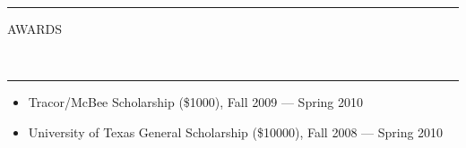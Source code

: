\documentclass[10pt, letterpaper, oneside]{article}
\newcommand{\HRule}[2]{\textcolor{#1}{\rule{\linewidth}{#2}}}
\newcommand{\sectiontitle}[1]{\begin{minipage}{\textwidth}\HRule{black}{0.25mm}\vspace{-10pt}\begin{center}\Large\MakeUppercase{#1}\end{center}\end{minipage}\\\HRule{light-grey}{0.15mm}\vspace{\baselineskip}}
\newenvironment{ressection}[1]{
  \sectiontitle{#1}}
  {\vspace{-\baselineskip}}
\newenvironment{tightressection}[1]{
  \begin{minipage}{\textwidth}
  \sectiontitle{#1}}
  {\vspace{\baselineskip}\end{minipage}}
\newenvironment{rescolumn}{
  \begin{minipage}{0.5\textwidth}
    \begin{itemize}[noitemsep,nolistsep]}
  {\end{itemize}
    \end{minipage}}
\newcommand{\resitem}[1]{
    \vspace{2pt}
    \item \begin{flushleft} #1 \end{flushleft}
}
\newcommand{\resentryheader}[4]{
    \vspace{-5pt}
    \textbf{#1}\hspace{\stretch{1}}\textcolor{light-grey}{#3}\\
    \textit{#2}\hspace{\stretch{1}}\textcolor{light-grey}{#4}\\
}
\newenvironment{resentry}[4]{
  \begin{minipage}{\textwidth}
    \resentryheader{#1}{#2}{#3}{#4}
        \vspace{-\baselineskip}
    \begin{itemize}[noitemsep,nolistsep]
}{
    \end{itemize}
        \vspace{\baselineskip}
        \end{minipage}
}
\begin{document}
     
\begin{tightressection}{awards}
  \begin{rescolumn}
      \resitem{Tracor/McBee Scholarship (\$1000), Fall 2009 --- Spring 2010}
    \end{rescolumn}
  \begin{rescolumn}
      \resitem{University of Texas General Scholarship (\$10000), Fall 2008 --- Spring 2010}
    \end{rescolumn}
\end{tightressection}
 
 
\end{document}
